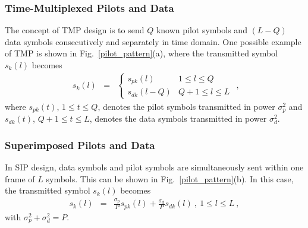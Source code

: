 \documentclass[10pt,fleqn, twocolumn]{IEEEtran}
\begin{document}
\subsubsection{Time-Multiplexed Pilots and Data}
The concept of TMP design is to send $Q$ known pilot symbols and
$\left(L-Q\right)$ data symbols consecutively and separately in
time domain. One possible example of TMP is shown in
Fig.~\ref{pilot_pattern}(a), where the transmitted symbol
$s_{k}(l)$ becomes
\begin{equation}
\begin{array}{rcl}
s_{k}\left(l\right)&=&
\begin{cases}
s_{pk}(l) & 1 \leq l \leq Q \\
s_{dk}(l-Q) & Q+1\leq l\leq L
\end{cases}
\end{array},\label{TMP_k}
\end{equation}
\noindent where $s_{pk}(t)$, $1\leq t \leq Q$, denotes the pilot
symbols transmitted in power $\sigma_{p}^2$ and $s_{dk}(t)$,
$Q+1\leq t \leq L$, denotes the data symbols transmitted in power
$\sigma_{d}^2$.
\subsubsection{Superimposed Pilots and Data}
In SIP design, data symbols and pilot symbols are simultaneously
sent within one frame of $L$ symbols. This can be shown in
Fig.~\ref{pilot_pattern}(b). In this case, the transmitted symbol
$s_{k}(l)$ becomes
\begin{equation}
\begin{array}{rcl}
s_{k}\left(l\right)&=&\frac{\sigma_{p}}{P}s_{pk}\left(l\right)+\frac{\sigma_{d}}{P}s_{dk}\left(l\right)\
,\ 1\leq l\leq L\ ,
\end{array}\label{SIP_k}
\end{equation}
\noindent with $\sigma_{p}^2+\sigma_{d}^2=P$.
\end{document}

